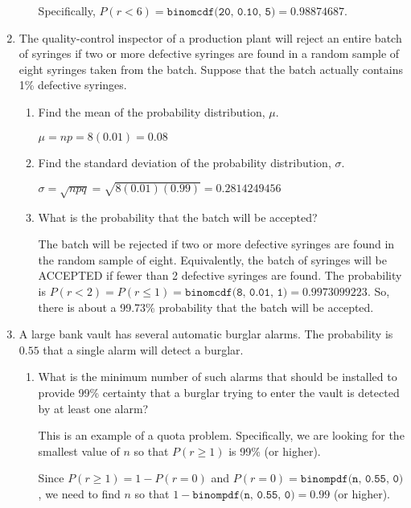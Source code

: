 \documentclass{article}
\newcommand{\answer}[1]{\color{red}#1}
\begin{document}
\begin{enumerate}
\begin{enumerate}
{	Specifically, $P(r<6) = \texttt{binomcdf(20, 0.10, 5)} = 0.98874687$.
	} 
	\end{enumerate}
	

\item The quality-control inspector of a production plant will reject an entire batch of syringes if two or more defective syringes are found in a random sample of eight syringes taken from the batch.  Suppose that the batch actually contains 1\% defective syringes.
	\begin{enumerate}
	\item Find the mean of the probability distribution, $\mu$. 
	
	{\answer $\mu = np = 8(0.01) = 0.08$
	}
	
	\item Find the standard deviation of the probability distribution, $\sigma$. 
	
	{\answer $\sigma = \sqrt{npq} = \sqrt{8 (0.01)(0.99)} = 0.2814249456$
	} 
	
	\item What is the probability that the batch will be accepted? 
	
	{\answer The batch will be rejected if two or more defective syringes are found in the random sample of eight.  Equivalently, the batch of syringes will be ACCEPTED if fewer than 2 defective syringes are found.  The probability is $P(r < 2) = P(r\leq 1) = \texttt{binomcdf(8, 0.01, 1)} = 0.9973099223$.  So, there is about a 99.73\% probability that the batch will be accepted.
	} 
	\end{enumerate}

\vfill

\item A large bank vault has several automatic burglar alarms.  The probability is $0.55$ that a single alarm will detect a burglar.
	\begin{enumerate}
	\item What is the minimum number of such alarms that should be installed to provide 99\% certainty that a burglar trying to enter the vault is detected by at least one alarm? 
	
	{\answer This is an example of a quota problem.  Specifically, we are looking for the smallest value of $n$ so that $P(r \geq 1)$ is 99\% (or higher). 
	
	Since $P(r \geq 1) = 1- P(r = 0)$ and $P(r = 0) = \texttt{binompdf(n, 0.55, 0)}$, we need to find $n$ so that $1-\texttt{binompdf(n, 0.55, 0)} = 0.99$ (or higher). 
	
}
\end{enumerate}
\end{enumerate}
\end{document}
